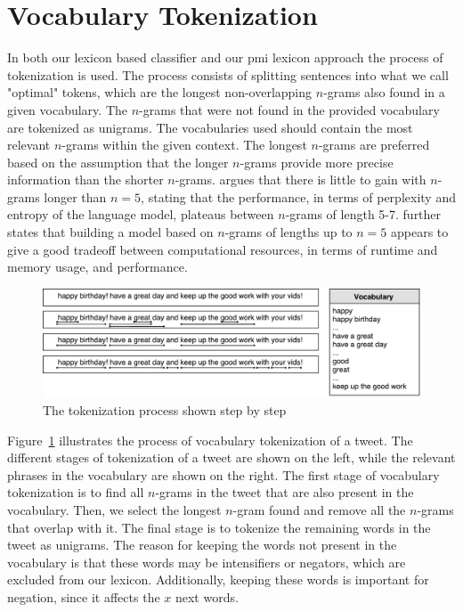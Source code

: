 \section{Vocabulary Tokenization}
\label{sec:tokenization}
In both our lexicon based classifier and our \ac{pmi} lexicon approach the process of tokenization is used. The process consists of splitting sentences into what we call "optimal" tokens, which are the longest non-overlapping $n$-grams also found in a given vocabulary. The $n$-grams that were not found in the provided vocabulary are tokenized as unigrams. The vocabularies used should contain the most relevant $n$-grams within the given context. The longest $n$-grams are preferred based on the assumption that the longer $n$-grams provide more precise information than the shorter $n$-grams. \cite{Goodman01abit} argues that there is little to gain with $n$-grams longer than $n=5$, stating that the performance, in terms of perplexity and entropy of the language model, plateaus between $n$-grams of length 5-7. \citeauthor{Goodman01abit} further states that building a model based on $n$-grams of lengths up to $n=5$ appears to give a good tradeoff between computational resources, in terms of runtime and memory usage, and performance.  \\

\begin{figure}[t]
    \centering
    \includegraphics[width=\textwidth]{./figs/tweet_tokenization}
    \caption{The tokenization process shown step by step}
    \label{fig:tweet_tokenization}
\end{figure}

Figure~\ref{fig:tweet_tokenization} illustrates the process of vocabulary tokenization of a tweet. The different stages of tokenization of a tweet are shown on the left, while the relevant phrases in the vocabulary are shown on the right. The first stage of vocabulary tokenization is to find all $n$-grams in the tweet that are also present in the vocabulary. Then, we select the longest $n$-gram found and remove all the $n$-grams that overlap with it. The final stage is to tokenize the remaining words in the tweet as unigrams. The reason for keeping the words not present in the vocabulary is that these words may be intensifiers or negators, which are excluded from our lexicon. Additionally, keeping these words is important for negation, since it affects the $x$ next words.

